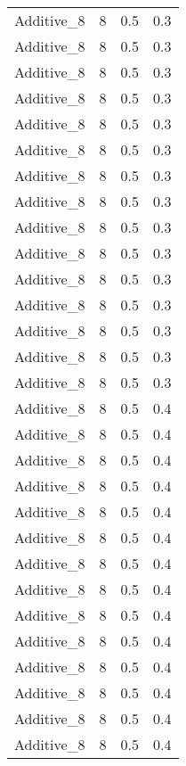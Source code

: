 \documentclass{article}
\begin{document}
\begin{longtable}[H]{lrrr}
 Additive\_8 &       8 &   0.5 &            0.3 \\
 Additive\_8 &       8 &   0.5 &            0.3 \\
 Additive\_8 &       8 &   0.5 &            0.3 \\
 Additive\_8 &       8 &   0.5 &            0.3 \\
 Additive\_8 &       8 &   0.5 &            0.3 \\
 Additive\_8 &       8 &   0.5 &            0.3 \\
 Additive\_8 &       8 &   0.5 &            0.3 \\
 Additive\_8 &       8 &   0.5 &            0.3 \\
 Additive\_8 &       8 &   0.5 &            0.3 \\
 Additive\_8 &       8 &   0.5 &            0.3 \\
 Additive\_8 &       8 &   0.5 &            0.3 \\
 Additive\_8 &       8 &   0.5 &            0.3 \\
 Additive\_8 &       8 &   0.5 &            0.3 \\
 Additive\_8 &       8 &   0.5 &            0.3 \\
 Additive\_8 &       8 &   0.5 &            0.3 \\
 Additive\_8 &       8 &   0.5 &            0.4 \\
 Additive\_8 &       8 &   0.5 &            0.4 \\
 Additive\_8 &       8 &   0.5 &            0.4 \\
 Additive\_8 &       8 &   0.5 &            0.4 \\
 Additive\_8 &       8 &   0.5 &            0.4 \\
 Additive\_8 &       8 &   0.5 &            0.4 \\
 Additive\_8 &       8 &   0.5 &            0.4 \\
 Additive\_8 &       8 &   0.5 &            0.4 \\
 Additive\_8 &       8 &   0.5 &            0.4 \\
 Additive\_8 &       8 &   0.5 &            0.4 \\
 Additive\_8 &       8 &   0.5 &            0.4 \\
 Additive\_8 &       8 &   0.5 &            0.4 \\
 Additive\_8 &       8 &   0.5 &            0.4 \\
 Additive\_8 &       8 &   0.5 &            0.4 \\

\end{longtable}
\end{document}

